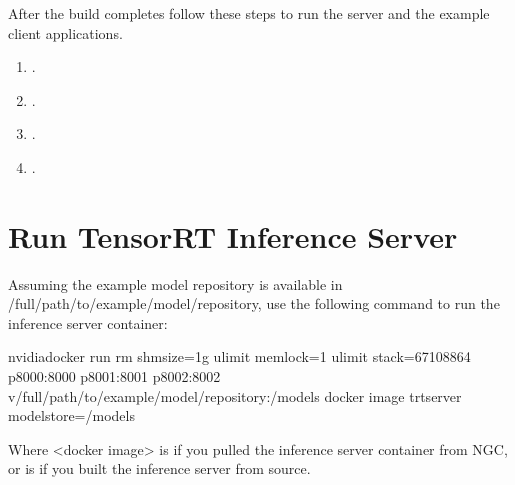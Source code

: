 \documentclass[letterpaper,10pt,english]{sphinxmanual}
\begin{document}
After the build completes follow these steps to run the server and the
example client applications.
\begin{enumerate}
\def\theenumi{\arabic{enumi}}
\def\labelenumi{\theenumi .}
\makeatletter\def\p@enumii{\p@enumi \theenumi .}\makeatother
\item {} 
{\hyperref[\detokenize{quickstart:section-run-tensorrt-inference-server}]{}}.

\item {} 
{\hyperref[\detokenize{quickstart:section-verify-inference-server-status}]{}}.

\item {} 
{\hyperref[\detokenize{quickstart:section-building-the-client-examples}]{}}.

\item {} 
{\hyperref[\detokenize{quickstart:section-running-the-image-classification-example}]{}}.

\end{enumerate}


\section{Run TensorRT Inference Server}
\label{\detokenize{quickstart:run-tensorrt-inference-server}}\label{\detokenize{quickstart:section-run-tensorrt-inference-server}}
Assuming the example model repository is available in
/full/path/to/example/model/repository, use the following command to
run the inference server container:

\begin{sphinxVerbatim}[commandchars=\\\{\}]
\PYGZdl{} nvidia\PYGZhy{}docker run \PYGZhy{}\PYGZhy{}rm \PYGZhy{}\PYGZhy{}shm\PYGZhy{}size=1g \PYGZhy{}\PYGZhy{}ulimit memlock=\PYGZhy{}1 \PYGZhy{}\PYGZhy{}ulimit stack=67108864 \PYGZhy{}p8000:8000 \PYGZhy{}p8001:8001 \PYGZhy{}p8002:8002 \PYGZhy{}v/full/path/to/example/model/repository:/models \PYGZlt{}docker image\PYGZgt{} trtserver \PYGZhy{}\PYGZhy{}model\PYGZhy{}store=/models
\end{sphinxVerbatim}

Where \textless{}docker image\textgreater{} is  if
you pulled the inference server container from NGC, or is
 if you built the inference server from source.
\end{document}
